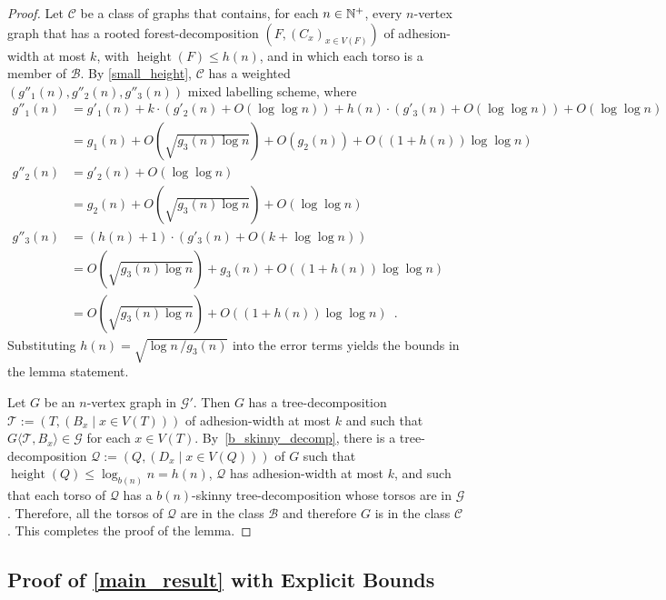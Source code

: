 \documentclass{patmorin}
\renewcommand{\le}{\leqslant}
\renewcommand{\leq}{\leqslant}
\newcommand{\torso}[2]{{#1}\langle{#2}\rangle}
\DeclareMathOperator{\height}{height}
\newcommand{\Oh}{O}
\newcommand{\calB}{\mathcal{B}}
\newcommand{\calC}{\mathcal{C}}
\newcommand{\calG}{\mathcal{G}}
\newcommand{\calQ}{\mathcal{Q}}
\newcommand{\calT}{\mathcal{T}}
\begin{document}
\begin{proof}
  Let $\calC$ be a class of graphs that contains, for each $n\in\mathbb{N}^+$,
  every $n$-vertex graph that has a rooted forest-decomposition $(F,(C_x)_{x\in V(F)})$
  of adhesion-width at most $k$, with $\height(F)\leq h(n)$, and
  in which each torso is a member of $\calB$.
  By \cref{small_height}, $\calC$ has a weighted \linebreak $(g''_1(n),g''_2(n),g''_3(n))$ mixed labelling scheme, where
  \begin{align*}
    g''_1(n)
     & = g'_1(n) + k\cdot(g'_2(n) + \Oh(\log\log n)) + h(n)\cdot (g'_3(n)+\Oh(\log\log n)) + \Oh(\log\log n) \\
     & = g_1(n) +  \Oh\left(\sqrt{g_3(n) \log n}\right) + \Oh(g_2(n)) + \Oh\left((1+h(n))\log\log n\right)   \\
    g''_2(n)
     & = g'_2(n) + \Oh(\log\log n)                                                                           \\
     & = g_2(n) + \Oh\left(\sqrt{{g_3(n)\log n}}\right) + \Oh(\log\log n)                                    \\
    g''_3(n)
     & = (h(n)+1)\cdot (g'_3(n)+\Oh(k+\log\log n))                                                           \\%
     & = \Oh\left(\sqrt{g_3(n)\log n}\right) + g_3(n) + \Oh\left((1+h(n))\log\log n\right)                   \\
     & = \Oh\left(\sqrt{g_3(n) \log n}\right) + \Oh\left((1+h(n))\log\log n\right)\enspace.
  \end{align*}
  Substituting $h(n) = \sqrt{\log n\, / g_3(n)}$ into the error terms yields the bounds in the lemma statement.

  Let $G$ be an $n$-vertex graph in $\calG'$.
  Then $G$ has a tree-decomposition $\calT:=(T,(B_x\mid x\in V(T)))$ of adhesion-width at most $k$ and such that $\torso{G}{\calT,B_x}\in\calG$ for each $x\in V(T)$.
  By~\cref{b_skinny_decomp}, there is a tree-decomposition $\calQ:=(Q,(D_x \mid x\in V(Q)))$ of $G$ such that $\height(Q)\le\log_{b(n)} n = h(n)$, $\calQ$ has adhesion-width at most $k$, and such that each torso of $\calQ$ has a $b(n)$-skinny tree-decomposition whose torsos are in $\calG$.
  Therefore, all the torsos of $\calQ$ are in the class $\calB$ and therefore $G$ is in the class $\calC$.  This completes the proof of the lemma.
\end{proof}

\subsection{Proof of \texorpdfstring{\cref{main_result}}{Theorem \ref*{main_result}} with Explicit Bounds}
\end{document}
